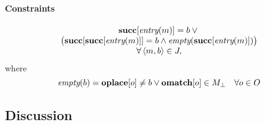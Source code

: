 \paragraph{Constraints}

\begin{equation}
  \begin{array}{c}
    \mVar{succ}[\mEntry(m)] = b \mOr \mbox{} \\
    \big(
      \mVar{succ}[\mVar{succ}[\mEntry(m)]] = b
      \mAnd
      \mEmptyBlock(\mVar{succ}[\mEntry(m)])
    \big) \\
    \forall \mTuple{m}{b} \in \mFallThroughSet,
  \end{array}
  \labelEquation{fall-through}
\end{equation}
%
where
%
\begin{equation*}
  \mEmptyBlock(b) =
  \mVar{oplace}[o] \neq b
  \mOr
  \mVar{omatch}[o] \in \mMatchSet[\mNull]
  \mQuantSep
  \forall o \in \mOpSet
\end{equation*}

\subsection{Discussion}
